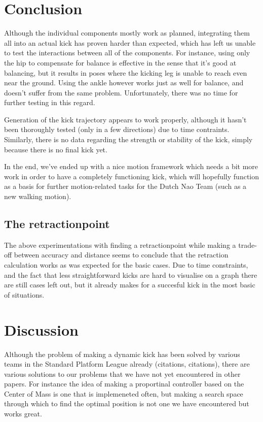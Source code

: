 \documentclass[a4paper]{article}
\begin{document}
\section{Conclusion}
Although the individual components mostly work as planned, integrating them all
into an actual kick has proven harder than expected, which has left us unable to
test the interactions between all of the components. For instance, using only the hip to
compensate for balance is effective in the sense that it's good at balancing,
but it results in poses where the kicking leg is unable to reach even near the
ground. Using the ankle however works just as well for balance, and doesn't
suffer from the same problem. Unfortunately, there was no time for further testing
in this regard.

Generation of the kick trajectory appears to work properly, although it hasn't
been thoroughly tested (only in a few directions) due to time
contraints. Similarly, there is no data regarding the strength or stability of
the kick, simply because there is no final kick yet.

In the end, we've ended up with a nice motion framework which needs a bit more
work in order to have a completely functioning kick, which will hopefully function
as a basis for further motion-related tasks for the Dutch Nao Team (such as a
new walking motion).

\subsection{The retractionpoint} 
The above experimentations  with finding a retractionpoint while making a
trade-off between accuracy and distance seems to conclude that the retraction calculation
works as was expected for the basic cases. Due to time constraints, and the fact
that less straightforward kicks are hard to visualise on a graph there are still
cases left out, but it already makes for a succesful kick in the most basic of
situations.

\section{Discussion}
Although the problem of making a dynamic kick has been solved by various teams
in the Standard Platform League already (citations, citations), there are various solutions to our
problems that we have not yet encountered in other papers. For instance the idea
of making a proportinal controller based on the Center of Mass is one that is
implemeneted often, but making a search space through which to find the optimal
position is not one we have encountered but works great.
\end{document}
